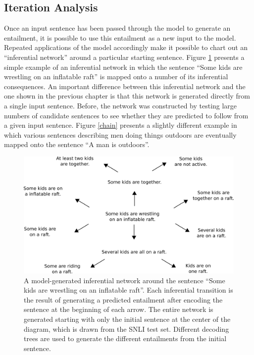 \subsection{Iteration Analysis}\label{sec:iteration}

Once an input sentence has been passed through the model to generate an entailment, it is possible to use this entailment as a new input to the model. Repeated applications of the model accordingly make it possible to chart out an ``inferential network'' around a particular starting sentence. Figure \ref{inf-gen} presents a simple example of an inferential network in which the sentence ``Some kids are wrestling on an inflatable raft'' is mapped onto a number of its inferential consequences. An important difference between this inferential network and the one shown in the previous chapter is that this network is generated directly from a single input sentence. Before, the network was constructed by testing large numbers of candidate sentences to see whether they are predicted to follow from a given input sentence. Figure \ref{chain} presents a slightly different example in which various sentences describing men doing things outdoors are eventually mapped onto the sentence ``A man is outdoors''.

\begin{figure}[t]
\begin{center}
\includegraphics[width=5in]{figures/outward-inf-gen.png}
\end{center}
\caption{A model-generated inferential network around the sentence ``Some kids are wrestling on an inflatable raft''. Each inferential transition is the result of generating a predicted entailment after encoding the sentence at the beginning of each arrow. The entire network is generated starting with only the initial sentence at the center of the diagram, which is drawn from the SNLI test set. Different decoding trees are used to generate the different entailments from the initial sentence.} 
\label{inf-gen}
\end{figure}

